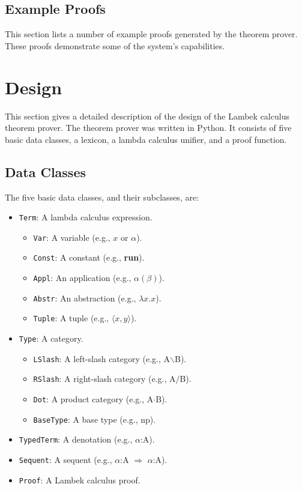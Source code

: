 \documentclass[11pt]{article}
\begin{document}
\newpage
\subsection{Example Proofs}
\label{sec:examples}

This section lists a number of example proofs generated by the theorem 
prover.  These proofs demonstrate some of the system's capabilities.



\newpage
\section{Design}

This section gives a detailed description of the design of the Lambek
calculus theorem prover.  The theorem prover was written in Python.
It consists of five basic data classes, a lexicon, a lambda calculus
unifier, and a proof function.

\subsection{Data Classes}

The five basic data classes, and their subclasses, are:
\begin{itemize}
  \item \texttt{Term}: A lambda calculus expression.
  \begin{itemize}
    \item \texttt{Var}: A variable (e.g., $x$ or $\alpha$).
    \item \texttt{Const}: A constant (e.g., \textbf{run}).
    \item \texttt{Appl}: An application (e.g., $\alpha(\beta)$).
    \item \texttt{Abstr}: An abstraction (e.g., $\lambda x.x$).
    \item \texttt{Tuple}: A tuple (e.g., $\langle x,y\rangle$).
  \end{itemize}
  \item \texttt{Type}: A category.
  \begin{itemize}
    \item \texttt{LSlash}: A left-slash category (e.g., A$\backslash$B).
    \item \texttt{RSlash}: A right-slash category (e.g., A$/$B).
    \item \texttt{Dot}: A product category (e.g., A$\cdot$B).
    \item \texttt{BaseType}: A base type (e.g., np).
  \end{itemize}
  \item \texttt{TypedTerm}: A denotation (e.g., $\alpha$:A).
  \item \texttt{Sequent}: A sequent (e.g., $\alpha$:A $\Rightarrow$ $\alpha$:A).
  \item \texttt{Proof}: A Lambek calculus proof.
\end{itemize}
\end{document}

